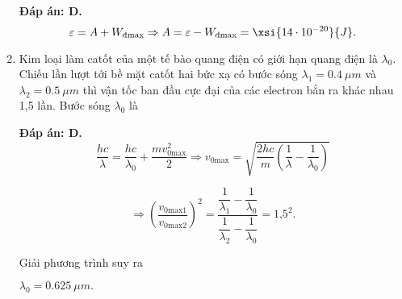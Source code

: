 \begin{enumerate}[label=\bfseries Câu \arabic*:]
{		
	}
	
	\loigiai
	{		\textbf{Đáp án: D.}
		$$\varepsilon = A + W_\text{đmax} \Rightarrow A = \varepsilon - W_\text{đmax} = \xsi{14 \cdot 10^{-20}}{J}.$$ 
	}
	\item {} 
	\cauhoi
	{Kim loại làm catốt của một tế bào quang điện có giới hạn quang điện là $\lambda_0$. Chiếu lần lượt tới bề mặt catốt hai bức xạ có bước sóng  $\lambda_1 = \SI{0,4}{\mu m}$ và $\lambda_2 = \SI{0,5}{\mu m}$ thì vận tốc ban đầu cực đại của các electron bắn ra khác nhau 1,5 lần. Bước sóng $\lambda_0$ là
		
		
	}
	
	\loigiai
	{		\textbf{Đáp án: D.}
		$$\dfrac{hc}{\lambda} = \dfrac{hc}{\lambda_0} + \dfrac{mv^2_\text{0max}}{2} \Rightarrow v_\text{0max} = \sqrt{\dfrac{2hc}{m}\left(\dfrac{1}{\lambda} - \dfrac{1}{\lambda_0}\right)}$$
		
		
		$$\Rightarrow \left(\dfrac{v_\text{0max1}}{v_\text{0max2}}\right)^2 = \dfrac{\dfrac{1}{\lambda_1} - \dfrac{1}{\lambda_0}}{\dfrac{1}{\lambda_2} - \dfrac{1}{\lambda_0}} = \text{1,5}^2.$$
		
		Giải phương trình suy ra 
		
		$\lambda_0 = \SI{0,625}{\mu m}.$
	}
\end{enumerate}

